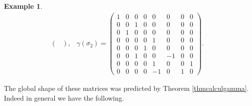 \documentclass[11pt, a4paper, twoside,reqno]{amsart}
\newtheorem{ex}[thm]{Example}
\begin{document}
\begin{ex}
\[\begin{array}{cc}
\begin{pmatrix}
\end{pmatrix}, 
&\gamma(\sigma_2)=\begin{pmatrix}
1 & 0 & 0 & 0 & 0 & 0 & 0 & 0  \\
0 & 0 & 1 & 0 & 0 & 0 & 0 & 0  \\
0 & 1 & 0 & 0 & 0 & 0 & 0 & 0  \\
0 & 0 & 0 & 0 & 1 & 0 & 0 & 0  \\
0 & 0 & 0 & 1 & 0 & 0 & 0 & 0 \\
0 & 0 & 1 & 0 & 0 & -1 & 0 & 0\\
0 & 0 & 0 & 0 & 1 & 0 & 0 & 1 \\
0 & 0 & 0 & 0 & -1 & 0 & 1 & 0 
\end{pmatrix}.
\end{array}
\]
\end{ex}

The global shape of these matrices was predicted by Theorem \ref{thmcalculgamma}. Indeed in general we have the following.
\end{document}
